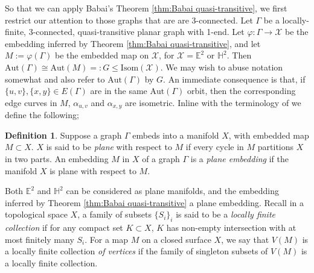 \documentclass{article}
\numberwithin{equation}{section}
\newcommand{\EE}{\mathbb{E}}
\newcommand{\HH}{\mathbb{H}}
\theoremstyle{definition}
\newtheorem{definition}[lemma]{Definition}
\theoremstyle{remark}
\begin{document}
So that we can apply Babai's Theorem \ref{thm:Babai quasi-transitive}, we first restrict our attention to those graphs that are are 3-connected. Let $\Gamma$ be a locally-finite, 3-connected, quasi-transitive planar graph with 1-end. Let $\varphi:\Gamma\rightarrow \mathcal{X}$ be the embedding inferred by Theorem \ref{thm:Babai quasi-transitive}, and let $M:=\varphi(\Gamma)$ be the embedded map on $\mathcal{X}$, for $\mathcal{X}=\EE^2$ or $\HH^2$. Then  $\text{Aut}(\Gamma)\cong\text{Aut}(M)=:G\leq \text{Isom}(\mathcal{X})$. We may wish to abuse notation somewhat and also refer to $\text{Aut}(\Gamma)$ by $G$.
An immediate consequence is that, if $\{u,v\},\{x,y\}\in E(\Gamma)$ are in the same $\text{Aut}(\Gamma)$ orbit, then the corresponding edge curves in $M$, $\alpha_{u,v}$ and $\alpha_{x,y}$ are isometric.
Inline with the terminology of \cite{Babai97} we define the following;

\begin{definition}
    Suppose a graph $\Gamma$ embeds into a manifold $X$, with embedded map $M\subset X$. $X$ is said to be \textit{plane} with respect to $M$ if every cycle in $M$ partitions $X$ in two parts. An embedding $M$ in $X$ of a graph $\Gamma$ is a \textit{plane embedding} if the manifold $X$ is plane with respect to $M$.
\end{definition}
Both $\EE^2$ and $\HH^2$ can be considered as plane manifolds, and the embedding inferred by Theorem \ref{thm:Babai quasi-transitive} a plane embedding.
Recall in a topological space $X$, a family of subsets $\{S_i\}_i$ is said to be a \textit{locally finite collection} if for any compact set $K\subset X$, $K$ has non-empty intersection with at most finitely many $S_i$. For a map $M$ on a closed surface $X$, we say that $V(M)$ is a locally finite collection \textit{of vertices} if the family of singleton subsets of $V(M)$ is a locally finite collection.
\end{document}

